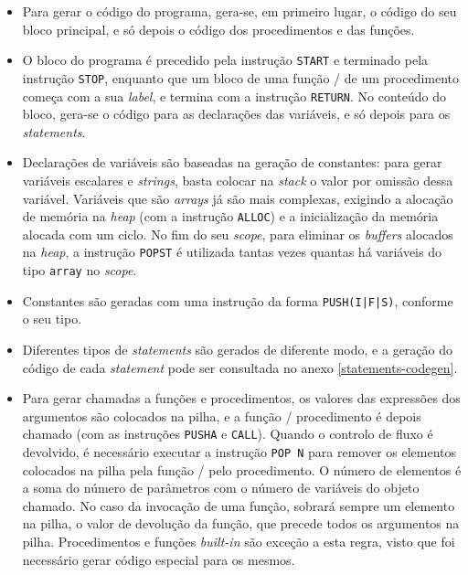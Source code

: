 \documentclass[12pt, a4paper]{article}
\begin{document}
\begin{itemize}
    \item Para gerar o código do programa, gera-se, em primeiro lugar, o código do seu bloco
        principal, e só depois o código dos procedimentos e das funções.

    \item O bloco do programa é precedido pela instrução \texttt{START} e terminado pela instrução
        \texttt{STOP}, enquanto que um bloco de uma função / de um procedimento começa com a sua
        \emph{label}, e termina com a instrução \texttt{RETURN}. No conteúdo do bloco, gera-se o
        código para as declarações das variáveis, e só depois para os \emph{statements}.

    \item Declarações de variáveis são baseadas na geração de constantes: para gerar variáveis
        escalares e \emph{strings}, basta colocar na \emph{stack} o valor por omissão dessa
        variável. Variáveis que são \emph{arrays} já são mais complexas, exigindo a alocação de
        memória na \emph{heap} (com a instrução \texttt{ALLOC}) e a inicialização da memória alocada
        com um ciclo. No fim do seu \emph{scope}, para eliminar os \emph{buffers} alocados na
        \emph{heap}, a instrução \texttt{POPST} é utilizada tantas vezes quantas há variáveis do
        tipo \texttt{array} no \emph{scope}.

    \item Constantes são geradas com uma instrução da forma \texttt{PUSH(I|F|S)}, conforme o seu
        tipo.

    \item Diferentes tipos de \emph{statements} são gerados de diferente modo, e a geração do código
        de cada \emph{statement} pode ser consultada no anexo \ref{statements-codegen}.

    \item Para gerar chamadas a funções e procedimentos, os valores das expressões dos argumentos
        são colocados na pilha, e a função / procedimento é depois chamado (com as instruções
        \texttt{PUSHA} e \texttt{CALL}). Quando o controlo de fluxo é devolvido, é necessário
        executar a instrução \texttt{POP N} para remover os elementos colocados na pilha pela
        função / pelo procedimento. O número de elementos é a soma do número de parâmetros com o
        número de variáveis do objeto chamado. No caso da invocação de uma função, sobrará sempre
        um elemento na pilha, o valor de devolução da função, que precede todos os argumentos na
        pilha. Procedimentos e funções \emph{built-in} são exceção a esta regra, visto que foi
        necessário gerar código especial para os mesmos.


\end{itemize}
\end{document}
